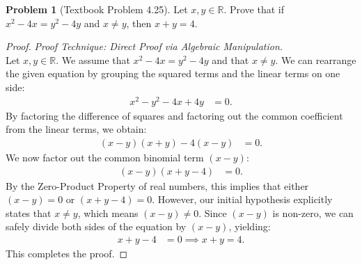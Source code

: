 \documentclass[11pt]{article}
\theoremstyle{definition}
\newtheorem{problem}{Problem}
\theoremstyle{remark}
\begin{document}
\begin{itemize}
\begin{problem}[Textbook Problem 4.25]
Let $x, y \in \mathbb{R}$. Prove that if $x^2 - 4x = y^2 - 4y$ and $x \ne y$, then $x + y = 4$.
\end{problem}
\begin{proof}
\textit{Proof Technique: Direct Proof via Algebraic Manipulation.} \\
Let $x, y \in \mathbb{R}$. We assume that $x^2 - 4x = y^2 - 4y$ and that $x \ne y$. 
We can rearrange the given equation by grouping the squared terms and the linear terms on one side:
\begin{align*}
    x^2 - y^2 - 4x + 4y &= 0.
\end{align*}
By factoring the difference of squares and factoring out the common coefficient from the linear terms, we obtain:
\begin{align*}
    (x - y)(x + y) - 4(x - y) &= 0.
\end{align*}
We now factor out the common binomial term $(x - y)$:
\begin{align*}
    (x - y)(x + y - 4) &= 0.
\end{align*}
By the Zero-Product Property of real numbers, this implies that either $(x - y) = 0$ or $(x + y - 4) = 0$. 
However, our initial hypothesis explicitly states that $x \ne y$, which means $(x - y) \ne 0$. 
Since $(x - y)$ is non-zero, we can safely divide both sides of the equation by $(x - y)$, yielding:
\begin{align*}
    x + y - 4 &= 0 \implies x + y = 4.
\end{align*}
This completes the proof.
\end{proof}


\end{itemize}
\end{document}
